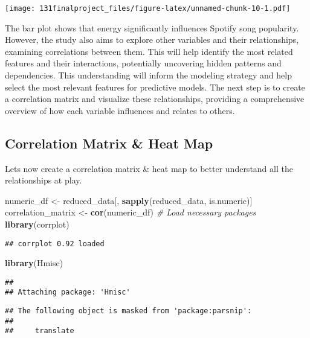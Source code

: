 \documentclass[
]{article}
\newenvironment{Shaded}{\begin{snugshade}}{\end{snugshade}}
\newcommand{\CommentTok}[1]{\textcolor[rgb]{0.56,0.35,0.01}{\textit{#1}}}
\newcommand{\FunctionTok}[1]{\textcolor[rgb]{0.13,0.29,0.53}{\textbf{#1}}}
\newcommand{\NormalTok}[1]{#1}
\newcommand{\OtherTok}[1]{\textcolor[rgb]{0.56,0.35,0.01}{#1}}
\begin{document}
\texttt{[image: 131finalproject\_files/figure-latex/unnamed-chunk-10-1.pdf]}

The bar plot shows that energy significantly influences Spotify song
popularity. However, the study also aims to explore other variables and
their relationships, examining correlations between them. This will help
identify the most related features and their interactions, potentially
uncovering hidden patterns and dependencies. This understanding will
inform the modeling strategy and help select the most relevant features
for predictive models. The next step is to create a correlation matrix
and visualize these relationships, providing a comprehensive overview of
how each variable influences and relates to others.

\hypertarget{correlation-matrix-heat-map}{%
\subsection{\texorpdfstring{\textbf{Correlation Matrix \& Heat
Map}}{Correlation Matrix \& Heat Map}}\label{correlation-matrix-heat-map}}

Lets now create a correlation matrix \& heat map to better understand
all the relationships at play.

\begin{Shaded}
\begin{Highlighting}[]
\NormalTok{numeric\_df }\OtherTok{\textless{}{-}}\NormalTok{ reduced\_data[, }\FunctionTok{sapply}\NormalTok{(reduced\_data, is.numeric)]}
\NormalTok{correlation\_matrix }\OtherTok{\textless{}{-}} \FunctionTok{cor}\NormalTok{(numeric\_df)}
\CommentTok{\# Load necessary packages}
\FunctionTok{library}\NormalTok{(corrplot)}
\end{Highlighting}
\end{Shaded}

\begin{verbatim}
## corrplot 0.92 loaded
\end{verbatim}

\begin{Shaded}
\begin{Highlighting}[]
\FunctionTok{library}\NormalTok{(Hmisc)}
\end{Highlighting}
\end{Shaded}

\begin{verbatim}
## 
## Attaching package: 'Hmisc'
\end{verbatim}

\begin{verbatim}
## The following object is masked from 'package:parsnip':
## 
##     translate
\end{verbatim}
\end{document}
